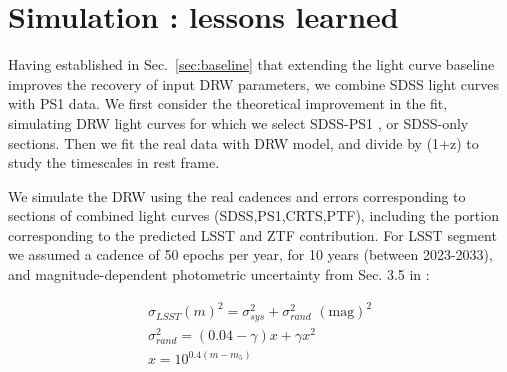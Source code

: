 \documentclass[twocolumn]{aastex62}
\begin{document}




\section{Simulation : lessons learned}

Having established in Sec.~\ref{sec:baseline} that extending the light curve baseline improves the recovery of input DRW parameters,  we combine SDSS light curves with PS1 data. We first consider the theoretical improvement in the fit, simulating DRW light curves for which we select SDSS-PS1 , or SDSS-only sections.  Then we fit the real data with DRW model, and divide by (1+z) to study the timescales in rest frame. 


We simulate the DRW using the real cadences and errors corresponding to sections of combined light curves (SDSS,PS1,CRTS,PTF), including the portion corresponding to the predicted LSST and ZTF contribution.  For LSST segment we assumed a cadence of 50 epochs per year,  for 10 years (between 2023-2033), and  magnitude-dependent photometric uncertainty from Sec. 3.5 in \citet{lsstscibook}:

\begin{eqnarray}
\sigma_{LSST}(m)^{2} = \sigma_{sys}^{2} + \sigma_{rand}^{2} \,\, \mathrm{(mag)}^{2}\\
\sigma_{rand}^{2} = (0.04-\gamma)x + \gamma x^{2} \\
x = 10^{0.4(m-m_{5})}
\end{eqnarray}
\end{document}
